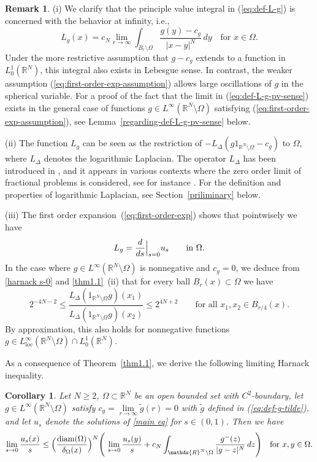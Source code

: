 \documentclass[notitlepage,11pt,reqno]{amsart}
\newtheorem{corollary}[theorem]{Corollary}
\theoremstyle{definition}
\newtheorem{remark}[theorem]{Remark}
\numberwithin{equation}{section}
\newcommand{\loc}{\mathrm{loc}}
\newcommand{\RRN}{\mathds{R}^{N}}
\newcommand{\R}{\mathds{R}}
\newcommand{\RR}{\mathds{R}}
\DeclareMathOperator*{\diam}{diam}
\begin{document}
\begin{remark}
  \label{loglap-def}
  (i)  We clarify that the principle value integral in (\ref{eq:def-L-g}) is concerned with the behavior at infinity, i.e.,
    \begin{equation}
      \label{eq:def-L-g-pv-sense}
    L_g(x)= c_{N} \lim_{r \to \infty}\int_{B_r \setminus \Omega}\frac{g(y)-c_g}{|x-y|^N}\,dy \quad \text{for $x \in \Omega$.}
  \end{equation}
  Under the more restrictive assumption that $g-c_g$ extends to a function in $L^1_0(\RR^N)$, this integral also exists in Lebesgue sense. In contrast, the weaker assumption (\ref{eq:first-order-exp-assumption}) allows large oscillations of $g$ in the spherical variable. For a proof of the fact that
  the limit in (\ref{eq:def-L-g-pv-sense}) exists in the general case of functions $g \in L^\infty(\RR^N \setminus \Omega)$ satisfying (\ref{eq:first-order-exp-assumption}), see Lemma~\ref{regarding-def-L-g-pv-sense} below.

  (ii) The function $L_g$ can be seen as the restriction of $-L_\Delta (g1_{\RR^N \setminus \Omega}-c_g)$ to $\Omega$, where $L_\Delta$ denotes the logarithmic Laplacian. The operator $L_\Delta$ has been introduced in \cite{CW19}, and it appears in various contexts where the zero order limit of fractional problems is considered, see for instance \cite{FJW22,CW19,CHW,AS23,HS22,DLNP21,FS25, CLS24, HSLRS25, CV22, C23}. For the definition and properties of logarithmic Laplacian, see Section~\ref{priliminary} below.

  (iii) The first order expansion~(\ref{eq:first-order-exp}) shows that pointwisely we have
  $$
  L_g = \frac{d}{ds}\Bigl|_{s=0}u_s \qquad \text{in $\Omega$.}
  $$
  In the case where $g \in L^{\infty}(\RR^N\setminus \Omega)$ is nonnegative and $c_g =0$, we  deduce from \eqref{harnack s-0} and \cref{thm1.1}\, (ii) that
  for every ball $B_r(x)\subset \Omega$ we have 
$$
2^{-4N-2}\leq \frac{L_{\Delta}(1_{\RR^N\setminus \Omega}g)(x_1)}{L_{\Delta}(1_{\RR^N\setminus \Omega}g)(x_2)} \le 2^{4N+2} \qquad \text{for all $x_1,x_2 \in B_{r/4}(x)$.}
$$
By approximation, this also holds for nonnegative functions $g \in L^{\infty}_{\loc}(\RR^N\setminus \Omega) \cap L^1_0(\R^N)$.
\end{remark}

As a consequence of Theorem~\ref{thm1.1}, we derive the following limiting Harnack inequality.


\begin{corollary}\label{cor-harnack}
  Let $N\geq 2$, $\Omega \subset \RRN$ be an open bounded set with $C^2$-boundary, let $g \in L^{\infty}(\RR^N\setminus \Omega)$ satisfy $c_g = \lim \limits_{r \to \infty}\tilde g(r)=0$ with $\tilde g$ defined in (\ref{eq:def-g-tilde}), and let $u_s$ denote the solutions of \eqref{main eq} for $s \in (0,1)$. Then we have
\begin{align}\label{harnack}
    \lim_{s\to 0}\frac{u_s(x)}{s}\leq \Bigl(\frac{\diam(\Omega)}{\delta_\Omega(x)}\Bigr)^N \Bigg(\,\lim_{s\to 0}\frac{u_s(y)}{s}+c_N \int_{\RR^N\setminus \Omega}\frac{g^{-}(z)}{|y-z|^N}\,dz\Bigg) \quad \text{for $x,y \in \Omega$.}
\end{align}
\end{corollary}
\end{document}
